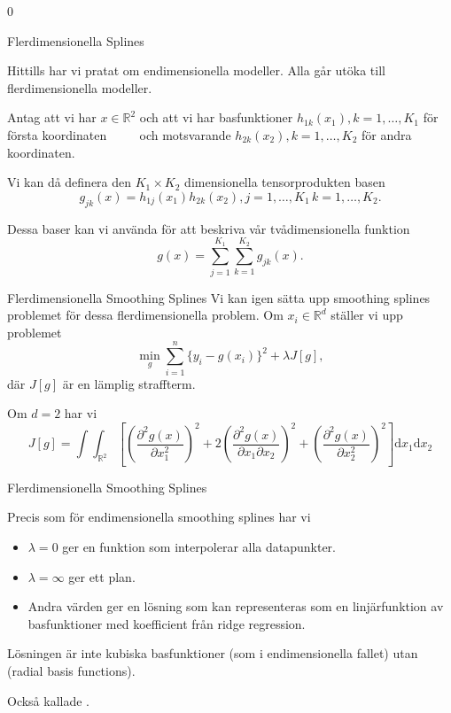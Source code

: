 0\documentclass[10pt,english]{beamer}
\begin{document}
\begin{frame}{Flerdimensionella Splines}
    
    Hittills har vi pratat om endimensionella modeller. Alla går utöka till flerdimensionella modeller.

    Antag att vi har $x \in \mathbb{R}^2$ och att vi har basfunktioner $h_{1k}(x_1), k = 1, \ldots, K_1$ för första koordinaten $\qquad$ och motsvarande $h_{2k}(x_2), k = 1, \ldots, K_2$ för andra koordinaten.

    Vi kan då definera den $K_1 \times K_2$ dimensionella tensorprodukten basen
    \begin{equation*}
        g_{jk}(x) = h_{1j}(x_1)h_{2k}(x_2), j = 1,\ldots,K_1 \, k = 1, \ldots, K_2.
    \end{equation*}

    Dessa baser kan vi använda för att beskriva vår tvådimensionella funktion
    \begin{equation*}
        g(x) = \sum_{j=1}^{K_1} \sum_{k=1}^{K_2} g_{jk}(x).
    \end{equation*}

\end{frame}

\begin{frame}{Flerdimensionella Smoothing Splines}
    Vi kan igen sätta upp smoothing splines problemet för dessa flerdimensionella problem. Om $x_i \in \mathbb{R}^d$ ställer vi upp problemet
    \begin{equation*}
        \min_g \sum_{i=1}^{n}\{y_i - g(x_i)\}^2 + \lambda J[g],
    \end{equation*}
    där $J[g]$ är en lämplig straffterm.

    Om $d=2$ har vi
    \begin{equation*}
        J[g] = \int \int_{\mathbb{R}^2} \left[ \left( \frac{\partial^2 g(x)}{\partial x_1^2}\right)^2 + 2 \left(\frac{\partial^2 g(x)}{\partial x_1 \partial x_2}\right)^2 + \left(\frac{\partial^2 g(x)}{\partial x_2^2}\right)^2  \right] \mathrm{d}x_1 \mathrm{d} x_2
    \end{equation*}
\end{frame}

\begin{frame}{Flerdimensionella Smoothing Splines}

    Precis som för endimensionella smoothing splines har vi
    \begin{itemize}
        \item $\lambda = 0$ ger en funktion som interpolerar alla datapunkter.
        \item $\lambda = \infty$ ger ett plan.
        \item Andra värden ger en lösning som kan representeras som en linjärfunktion av basfunktioner med koefficient från ridge regression.
    \end{itemize}

    Lösningen är inte kubiska basfunktioner (som i endimensionella fallet) utan  (radial basis functions).

    Också kallade .
    
\end{frame}
\end{document}
